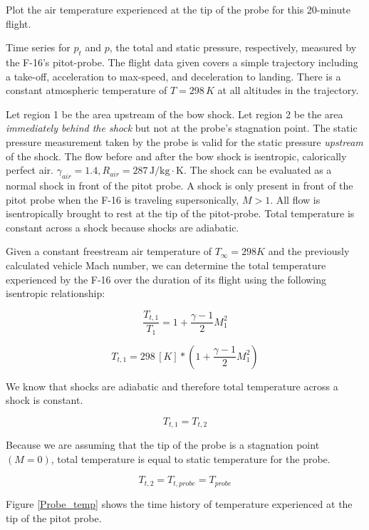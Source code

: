 \documentclass[../main.tex]{subfiles}
\begin{document}
\clearpage

 Plot the air temperature experienced at the tip of the probe for this 20-minute flight.

\givens{}

Time series for \(p_t\) and \(p\), the total and static pressure, respectively, measured by the F-16's pitot-probe.
The flight data given covers a simple trajectory including a take-off, acceleration to max-speed, and deceleration to landing.
There is a constant atmospheric temperature of \(T=298\,K\) at all altitudes in the trajectory.

\assumptions{}

Let region 1 be the area upstream of the bow shock.
Let region 2 be the area \textit{immediately behind the shock} but not at the probe's stagnation point.
The static pressure measurement taken by the probe is valid for the static pressure \textit{upstream} of the shock.
The flow before and after the bow shock is isentropic, calorically perfect air. \(\gamma_{air} = 1.4, R_{air} = 287 \, \unit{\joule/\kilogram\cdot\kelvin}\).
The shock can be evaluated as a normal shock in front of the pitot probe.
A shock is only present in front of the pitot probe when the F-16 is traveling supersonically, \(M > 1\).
All flow is isentropically brought to rest at the tip of the pitot-probe. Total temperature is constant across a shock because shocks are adiabatic.

\solution{}

Given a constant freestream air temperature of \(T_\infty = 298 K\) and the previously calculated vehicle Mach number, we can determine the total temperature experienced by the F-16 over the duration of its flight using the following isentropic relationship:

\[
    \frac{T_{t,1}}{T_1} = 1 + \frac{\gamma-1}{2} M_1^2
\]

\[
   T_{t,1} = 298 \, [K]* \left({1 + \frac{\gamma-1}{2} M_1^2}\right)
\]

We know that shocks are adiabatic and therefore total temperature across a shock is constant.

\[
    T_{t,1} = T_{t,2}
\]

Because we are assuming that the tip of the probe is a stagnation point \((M=0)\), total temperature is equal to static temperature for the probe.

\[
    T_{t,2} = T_{t,probe} = T_{probe}
\]

Figure \ref{Probe_temp} shows the time history of temperature experienced at the tip of the pitot probe.
\end{document}
